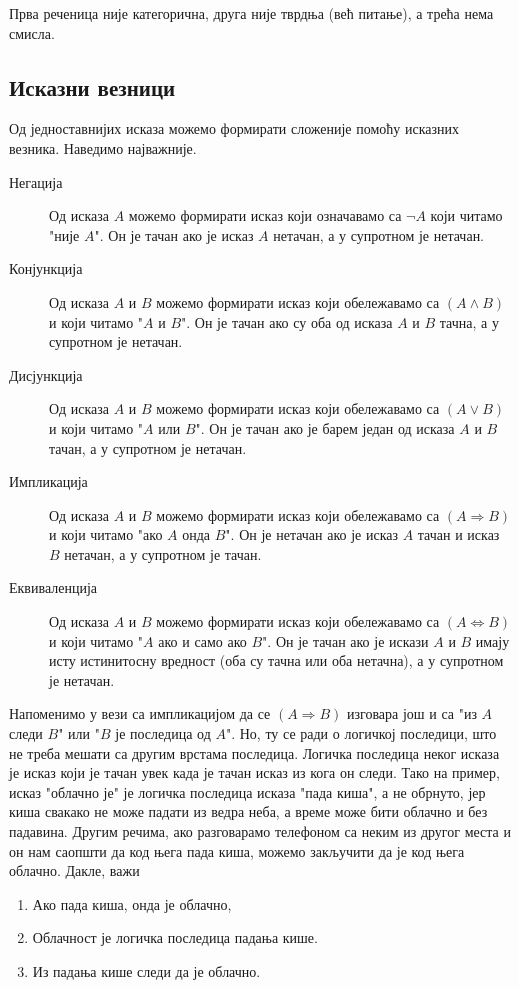 \documentclass[a4paper]{book}
\begin{document}
Прва реченица није категорична, друга није тврдња (већ питање), а трећа нема смисла.

\subsection{Исказни везници}

\indent

Од једноставнијих исказа можемо формирати сложеније помоћу исказних везника.
На\-ве\-ди\-мо најважније.
\begin{description}
\item[Негација] Од исказа $A$ можемо формирати исказ који означавамо са $\lnot A$ који
читамо "није $A$". Он је тачан ако је исказ $A$ нетачан, а у супротном је нетачан.
\item[Конјункција] Од исказа $A$ и $B$ можемо формирати исказ који обележавамо са $(A\land B)$
и који читамо "$A$ и $B$". Он је тачан ако су оба од исказа $A$ и $B$ тачна, а у супротном је нетачан.
\item[Дисјункција] Од исказа $A$ и $B$ можемо формирати исказ који обележавамо са $(A\lor B)$
и који читамо "$A$ или $B$". Он је тачан ако је барем један од исказа $A$ и $B$ тачан, а у супротном је нетачан.
\item[Импликација] Од исказа $A$ и $B$ можемо формирати исказ који обележавамо са $(A\Rightarrow B)$
и који читамо "ако $A$ онда $B$". Он је нетачан ако је исказ $A$ тачан и исказ $B$ нетачан, а у супротном је тачан.
\item[Еквиваленција] Од исказа $A$ и $B$ можемо формирати исказ који обележавамо са $(A\Leftrightarrow B)$
и који читамо "$A$ ако и само ако $B$". Он је тачан ако је искази $A$ и $B$ имају исту истинитосну вредност
(оба су тачна или оба нетачна), а у супротном је нетачан.
\end{description}

Напоменимо у вези са импликацијом да се $(A\Rightarrow B)$ изговара још и са "из $A$ следи $B$" или
"$B$ је последица од $A$". Но, ту се ради о логичкој последици, што не треба мешати са другим врстама последица.
Логичка последица неког исказа је исказ који је тачан увек када је тачан исказ из кога он следи. Тако на пример,
исказ "облачно је" је логичка последица исказа "пада киша", а не обрнуто, јер киша свакако не може падати из ведра неба,
а време може бити облачно и без падавина. Другим речима, ако разговарамо телефоном са неким из другог места и он нам
саопшти да код њега пада киша, можемо закључити да је код њега облачно. Дакле, важи
\begin{enumerate}
\item
Ако пада киша, онда је облачно,
\item
Облачност је логичка последица падања кише.
\item
Из падања кише следи да је облачно.
\end{enumerate}
\end{document}
